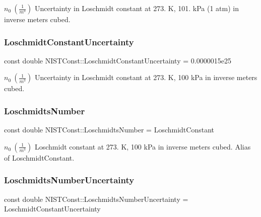 $n_0 \ (\frac{1}{m^3})$ Uncertainty in Loschmidt constant at 273. K, 101. k\+Pa (1 atm) in inverse meters cubed. \mbox{\label{group___n_i_s_t_const-_loschmidt_constant_gae1bf8845a08d0554f1045083a143c30a}} 
\subsubsection{\texorpdfstring{Loschmidt\+Constant\+Uncertainty}{LoschmidtConstantUncertainty}}
{\footnotesize\ttfamily const double N\+I\+S\+T\+Const\+::\+Loschmidt\+Constant\+Uncertainty = 0.\+0000015e25}

$n_0 \ (\frac{1}{m^3})$ Uncertainty in Loschmidt constant at 273. K, 100 k\+Pa in inverse meters cubed. \mbox{\label{group___n_i_s_t_const-_loschmidt_constant_gaf6143a6202718104ded1b92da2a0217f}} 
\subsubsection{\texorpdfstring{Loschmidts\+Number}{LoschmidtsNumber}}
{\footnotesize\ttfamily const double N\+I\+S\+T\+Const\+::\+Loschmidts\+Number = Loschmidt\+Constant}

$n_0 \ (\frac{1}{m^3})$ Loschmidt constant at 273. K, 100 k\+Pa in inverse meters cubed. Alias of Loschmidt\+Constant. \mbox{\label{group___n_i_s_t_const-_loschmidt_constant_gab851db21b311f09798d0df42d2e25f3f}} 
\subsubsection{\texorpdfstring{Loschmidts\+Number\+Uncertainty}{LoschmidtsNumberUncertainty}}
{\footnotesize\ttfamily const double N\+I\+S\+T\+Const\+::\+Loschmidts\+Number\+Uncertainty = Loschmidt\+Constant\+Uncertainty}

